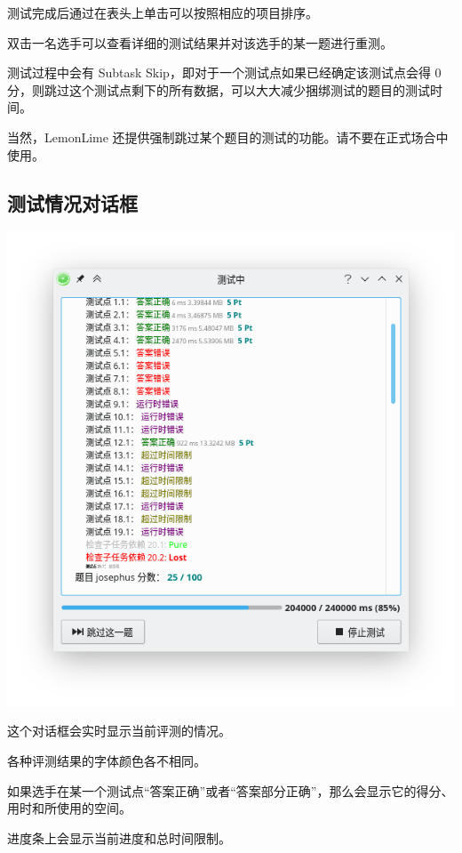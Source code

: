 \documentclass[UTF-8]{ctexart}
\begin{document}
		测试完成后通过在表头上单击可以按照相应的项目排序。

		双击一名选手可以查看详细的测试结果并对该选手的某一题进行重测。

		测试过程中会有 Subtask Skip，即对于一个测试点如果已经确定该测试点会得 0 分，则跳过这个测试点剩下的所有数据，可以大大减少捆绑测试的题目的测试时间。

		当然，LemonLime 还提供强制跳过某个题目的测试的功能。请不要在正式场合中使用。

		\subsection{测试情况对话框}

			\begin{center}
			\includegraphics[scale=0.4]{pics/judgingdialog.png}
			\end{center}

			这个对话框会实时显示当前评测的情况。

			各种评测结果的字体颜色各不相同。

			如果选手在某一个测试点“答案正确”或者“答案部分正确”，那么会显示它的得分、用时和所使用的空间。

			进度条上会显示当前进度和总时间限制。
\end{document}
